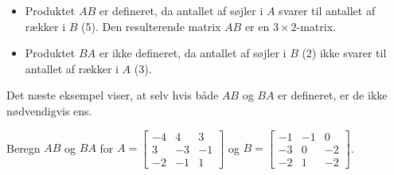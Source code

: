 \begin{solution}
    \begin{itemize}
        \item Produktet $A B$ er defineret, da antallet af søjler i $A$ svarer til antallet af rækker i $B$ (5). Den resulterende matrix $A B$ er en $3 \times 2$-matrix.
        \item Produktet $B A$ er ikke defineret, da antallet af søjler i $B$ (2) ikke svarer til antallet af rækker i $A$ (3).
    \end{itemize}
\end{solution}

Det næste eksempel viser, at selv hvis både $AB$ og $BA$ er defineret, er de ikke nødvendigvis ens.

\begin{example}
    Beregn $AB$ og $BA$ for $A = \left[\begin{array}{rrr}
        -4 & 4 & 3 \\
        3 & -3 & -1 \\
        -2 & -1 & 1
        \end{array}\right] $ og $B = \left[\begin{array}{rrr}
            -1 & -1 & 0 \\
            -3 & 0 & -2 \\
            -2 & 1 & -2
            \end{array}\right]$.

\end{example}

